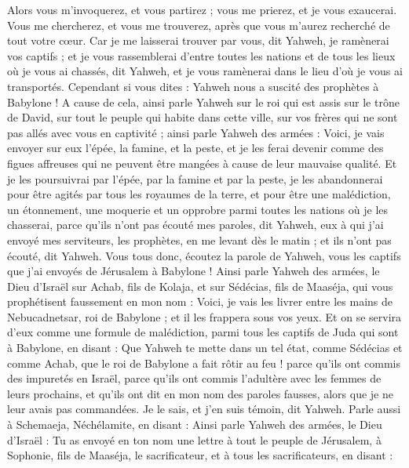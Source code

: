 \begin{multicols}{2}
Alors vous m'invoquerez, et vous partirez ; vous me prierez, et je vous exaucerai.
Vous me chercherez, et vous me trouverez, après que vous m'aurez recherché de tout votre cœur.
Car je me laisserai trouver par vous, dit Yahweh, je ramènerai vos captifs ; et je vous rassemblerai d'entre toutes les nations et de tous les lieux où je vous ai chassés, dit Yahweh, et je vous ramènerai dans le lieu d'où je vous ai transportés.
Cependant si vous dites : Yahweh nous a suscité des prophètes à Babylone !
 A cause de cela, ainsi parle Yahweh sur le roi qui est assis sur le trône de David, sur tout le peuple qui habite dans cette ville, sur vos frères qui ne sont pas allés avec vous en captivité ;
ainsi parle Yahweh des armées : Voici, je vais envoyer sur eux l'épée, la famine, et la peste, et je les ferai devenir comme des figues affreuses qui ne peuvent être mangées à cause de leur mauvaise qualité.
Et je les poursuivrai par l'épée, par la famine et par la peste, je les abandonnerai pour être agités par tous les royaumes de la terre, et pour être une malédiction, un étonnement, une moquerie et un opprobre parmi toutes les nations où je les chasserai,
parce qu'ils n'ont pas écouté mes paroles, dit Yahweh, eux à qui j'ai envoyé mes serviteurs, les prophètes, en me levant dès le matin ; et ils n'ont pas écouté, dit Yahweh.
Vous tous donc, écoutez la parole de Yahweh, vous les captifs que j'ai envoyés de Jérusalem à Babylone !
Ainsi parle Yahweh des armées, le Dieu d'Israël sur Achab, fils de Kolaja, et sur Sédécias, fils de Maaséja, qui vous prophétisent faussement en mon nom : Voici, je vais les livrer entre les mains de Nebucadnetsar, roi de Babylone ; et il les frappera sous vos yeux.
Et on se servira d'eux comme une formule de malédiction, parmi tous les captifs de Juda qui sont à Babylone, en disant : Que Yahweh te mette dans un tel état, comme Sédécias et comme Achab, que le roi de Babylone a fait rôtir au feu !
parce qu'ils ont commis des impuretés en Israël, parce qu'ils ont commis l'adultère avec les femmes de leurs prochains, et qu'ils ont dit en mon nom des paroles fausses, alors que je ne leur avais pas commandées. Je le sais, et j'en suis témoin, dit Yahweh.
Parle aussi à Schemaeja, Néchélamite, en disant :
Ainsi parle Yahweh des armées, le Dieu d'Israël : Tu as envoyé en ton nom une lettre à tout le peuple de Jérusalem, à Sophonie, fils de Maaséja, le sacrificateur, et à tous les sacrificateurs, en disant :

\end{multicols}
